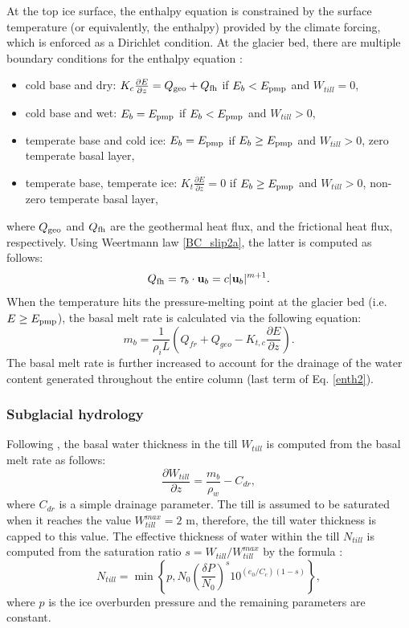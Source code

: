 \documentclass[gmd]{copernicus}
\begin{document}
At the top ice surface, the enthalpy equation is constrained by the surface temperature 
(or equivalently, the enthalpy) provided by the climate forcing, which is enforced as a 
Dirichlet condition.
At the glacier bed, there are multiple boundary conditions for the enthalpy equation
\citep{aschwanden2012enthalpy,wang2020two}:
\begin{itemize}
\item cold base and dry: $K_{c} \frac{\partial E}{ \partial z} = Q_{\rm geo} + Q_{\rm fh}$
if $E_b<E_{\rm pmp}$ and $W_{till} = 0$, 
\item cold base and wet: $ E_b = E_{\rm pmp} $ if $E_b<E_{\rm pmp}$ and $W_{till} > 0$,
\item temperate base and cold ice: $ E_b = E_{\rm pmp} $ if $E_b \ge E_{\rm pmp}$ and $W_{till}> 0$,
zero temperate basal layer,
\item temperate base, temperate ice: $ K_{t} \frac{\partial E}{ \partial z} = 0$ 
if $E_b \ge E_{\rm pmp}$ and $W_{till} > 0$, non-zero temperate basal layer,
\end{itemize}
where $Q_{\rm geo}$ and $Q_{\rm fh}$ are the geothermal heat flux, and the frictional heat flux, 
respectively. Using Weertmann law \eqref{BC_slip2a}, the latter is computed as follows:
\begin{equation}
Q_{\rm fh} = \tau_b \cdot {\bf u}_b = c | {\bf u}_b |^{m+1}. \label{def_Q}
\end{equation}
When the temperature hits the pressure-melting point at the glacier bed 
(i.e. $E \ge E_{\rm pmp}$), the basal melt rate is calculated via the following equation:
\begin{equation}
m_b = \frac{1}{\rho_i L} (Q_{fr}+Q_{geo} - K_{t,c} \frac{\partial E}{ \partial z}). 
\label{basal_melt_rate}
\end{equation}
The basal melt rate is further increased to account for the drainage of the water 
content generated throughout the entire column (last term of Eq. \eqref{enth2}).

\subsubsection{Subglacial hydrology}
\label{phys_subglacial_hydrology}

Following \citet{Bueler2015}, the basal water thickness in the till $W_{till}$ 
is computed from the basal melt rate as follows:
\begin{equation}
\frac{\partial W_{till} }{ \partial z} = \frac{m_b}{\rho_w} - C_{dr},
\label{W_till}
\end{equation}
where $C_{dr}$ is a simple drainage parameter. The till is assumed to be saturated 
when it reaches the value $W_{till}^{max} = 2$ m, therefore, the till water thickness 
is capped to this value. The effective thickness of water within the till $N_{till}$ 
is computed from the saturation ratio $s= W_{till} / W_{till}^{max}$ by the formula
\citep{Bueler2015}:
\begin{equation}
N_{till} = \min \left\{ p, N_0 \left( \frac{\delta P}{N_0} \right)^s 10^{(e_0/C_c)(1-s)} \right\},
\end{equation}
where $p$ is the ice overburden pressure and the remaining parameters are constant. 
 
\end{document}
